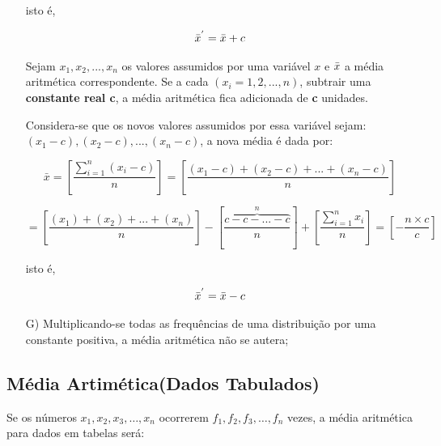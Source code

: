 \begin{enumerate}
isto é, 

$$\Bar{x}^{'}=\Bar{x}+c$$



\vskip0.3cm
\textbf{} 
\vskip0.3cm

Sejam $x_{1}, x_{2},...,x_{n}$ os valores assumidos por uma variável $x$ e $\Bar{x}$ a média aritmética correspondente. Se a cada $(x_{i}=1,2,...,n)$, subtrair uma \textbf{constante real c}, a média aritmética fica adicionada de \textbf{c} unidades.\vskip0.3cm


Considera-se que os novos valores assumidos por essa variável sejam: $(x_{1}-c),(x_{2}-c),...,(x_{n}-c)$, a nova média é dada por:


\newpage
\begin{equation}\label{media3}
     \bar{x} = \left[ \frac{\sum_{i=1}^{n}(x_{i}-c)}{n} \right] = \left[ \frac{(x_{1}-c)+(x_{2}-c)+...+(x_{n}-c)}{n} \right] 
\end{equation}

\begin{equation*}\label{media4}
  = \left[ \frac{(x_{1})+(x_{2})+...+(x_{n})}{n} \right] - \left[ \overbrace{\frac{c-c-...-c}{n}}^{n} \right] + \left[ \frac{\sum_{i=1}^{n}x_{i}}{n} \right] = \left[ - \frac{n \times c}{c} \right]
\end{equation*}

isto é, 

$$\Bar{x}^{'}=\Bar{x}-c$$




\item [{G)}]Multiplicando-se todas as frequências de uma distribuição por uma constante positiva, a média aritmética não se autera; 
\end{enumerate}















\subsection{Média Artimética(Dados Tabulados)}

Se os números $x_{1},x_{2},x_{3},\ldots, x_{n}$ ocorrerem $f_{1}, f_{2}, f_{3}, \ldots, f_{n}$ vezes, a média aritmética para dados em tabelas será:


